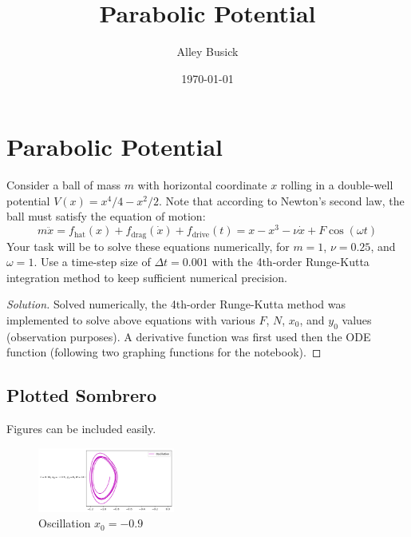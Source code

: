 \documentclass[aps,pra,notitlepage,amsmath,amssymb,letterpaper,12pt]{revtex4-1}
\newenvironment{problem}[2][Problem]{\begin{trivlist}
\item[\hskip \labelsep {\bfseries #1}\hskip \labelsep {\bfseries #2.}]}{\end{trivlist}}
\newenvironment{solution}{\begin{proof}[Solution]}{\end{proof}}
\begin{document}
 
\title{Parabolic Potential}
\author{Alley Busick}
\date{\today}

\maketitle

\section{Parabolic Potential} %

\begin{problem}{x.yz} 
Consider a ball of mass $m$ with horizontal coordinate $x$ rolling in a double-well potential $V(x) = x^4/4 - x^2/2$. Note that according to Newton's second law, the ball must satisfy the equation of motion: $$m\ddot{x} = f_{\text{hat}}(x) + f_{\text{drag}}(\dot{x}) + f_{\text{drive}}(t) = x - x^3 - \nu \dot{x} + F\cos(\omega t)$$ Your task will be to solve these equations numerically, for $m=1$, $\nu = 0.25$, and $\omega = 1$. Use a time-step size of $\Delta t = 0.001$ with the 4th-order Runge-Kutta integration method to keep sufficient numerical precision.
\end{problem}
 
\begin{solution} %
Solved numerically, the 4th-order Runge-Kutta method was implemented to solve above equations with various $F$, $N$, $x_0$, and $y_0$ values (observation purposes). A derivative function was first used then the ODE function (following two graphing functions for the notebook).
\end{solution}

\subsection{Plotted Sombrero} %

Figures can be included easily.

\begin{figure}[h!] %
  \includegraphics[width=0.4\textwidth]{-0.9.png}  %
  \caption{Oscillation $x_0=-0.9$}
  \label{fig:figlabel}
\end{figure}
\end{document}
